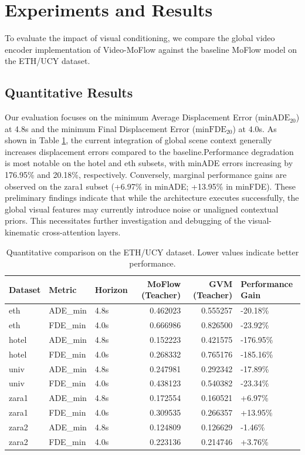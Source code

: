 \section{Experiments and Results}
To evaluate the impact of visual conditioning, we compare the global video encoder implementation of Video-MoFlow against the baseline MoFlow model on the ETH/UCY dataset.

\subsection{Quantitative Results}
Our evaluation focuses on the minimum Average Displacement Error ($\text{minADE}_{20}$) at 4.8s and the minimum Final Displacement Error ($\text{minFDE}_{20}$) at 4.0s. As shown in Table \ref{tab:eth_ucy_results}, the current integration of global scene context generally increases displacement errors compared to the baseline.Performance degradation is most notable on the hotel and eth subsets, with minADE errors increasing by 176.95\% and 20.18\%, respectively. Conversely, marginal performance gains are observed on the zara1 subset (+6.97\% in minADE; +13.95\% in minFDE). These preliminary findings indicate that while the architecture executes successfully, the global visual features may currently introduce noise or unaligned contextual priors. This necessitates further investigation and debugging of the visual-kinematic cross-attention layers.

\begin{table}[htpb]
    \centering
    \caption{Quantitative comparison on the ETH/UCY dataset. Lower values indicate better performance.}
    \label{tab:eth_ucy_results}
    \begin{tabular}{lllrrl}
        \toprule
        Dataset & Metric & Horizon & MoFlow (Teacher) & GVM (Teacher) & Performance Gain \\
        \midrule
        eth & ADE\_min & 4.8s & 0.462023 & 0.555257 & -20.18\% \\
        eth & FDE\_min & 4.0s & 0.666986 & 0.826500 & -23.92\% \\
        hotel & ADE\_min & 4.8s & 0.152223 & 0.421575 & -176.95\% \\
        hotel & FDE\_min & 4.0s & 0.268332 & 0.765176 & -185.16\% \\
        univ & ADE\_min & 4.8s & 0.247981 & 0.292342 & -17.89\% \\
        univ & FDE\_min & 4.0s & 0.438123 & 0.540382 & -23.34\% \\
        zara1 & ADE\_min & 4.8s & 0.172554 & 0.160521 & +6.97\% \\
        zara1 & FDE\_min & 4.0s & 0.309535 & 0.266357 & +13.95\% \\
        zara2 & ADE\_min & 4.8s & 0.124809 & 0.126629 & -1.46\% \\
        zara2 & FDE\_min & 4.0s & 0.223136 & 0.214746 & +3.76\% \\
        \bottomrule
    \end{tabular}
\end{table}

